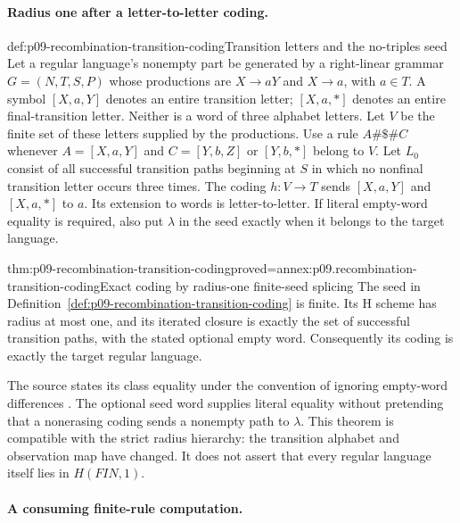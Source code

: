 \paragraph{Radius one after a letter-to-letter coding.}

\begin{hbdefinition}{def:p09-recombination-transition-coding}{Transition letters and the no-triples seed}
Let a regular language's nonempty part be generated by a right-linear
grammar \(G=(N,T,S,P)\) whose productions are \(X\to aY\) and
\(X\to a\), with \(a\in T\). A symbol \([X,a,Y]\) denotes an entire
transition letter; \([X,a,*]\) denotes an entire final-transition letter.
Neither is a word of three alphabet letters. Let \(V\) be the finite
set of these letters supplied by the productions.
Use a rule \(A\#\$\#C\) whenever
\(A=[X,a,Y]\) and \(C=[Y,b,Z]\) or \([Y,b,*]\) belong to \(V\).
Let \(L_0\) consist of all successful transition paths beginning at
\(S\) in which no nonfinal transition letter occurs three times.
The coding \(h:V\to T\) sends \([X,a,Y]\) and \([X,a,*]\) to \(a\).
Its extension to words is letter-to-letter. If literal empty-word equality
is required, also put \(\lambda\) in the seed exactly when it belongs
to the target language.
\end{hbdefinition}

\begin{hbtheorem}{thm:p09-recombination-transition-coding}{proved=annex:p09.recombination-transition-coding}{Exact coding by radius-one finite-seed splicing}
The seed in Definition~\ref{def:p09-recombination-transition-coding} is
finite. Its H scheme has radius at most one, and its iterated closure is
exactly the set of successful transition paths, with the stated optional
empty word. Consequently its coding is exactly the target regular language.
\end{hbtheorem}

The source states its class equality under the convention of ignoring
empty-word differences \cite[Theorem~3.5, pp.~317--318]{HeadPaunPixton1997RecombinationIntake}.
The optional seed word supplies literal equality without pretending that a
nonerasing coding sends a nonempty path to \(\lambda\).
This theorem is compatible with the strict radius hierarchy: the transition
alphabet and observation map have changed. It does not assert that every
regular language itself lies in \(H(FIN,1)\).

\paragraph{A consuming finite-rule computation.}

